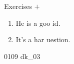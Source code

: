 \documentclass[aspectratio=169,xcolor={dvipsnames,table}]{beamer}
\begin{document}
\begin{frame}[plain]{Exercises  $+$ }
  \Large
  \begin{enumerate}
    \item<2-> He is a goo  id.
    \item<4-> It's a har  uestion.
  \end{enumerate}


  \hfill{\tiny 0109}\,{\scriptsize {}\,dk\_03}

\end{frame}
\end{document}
